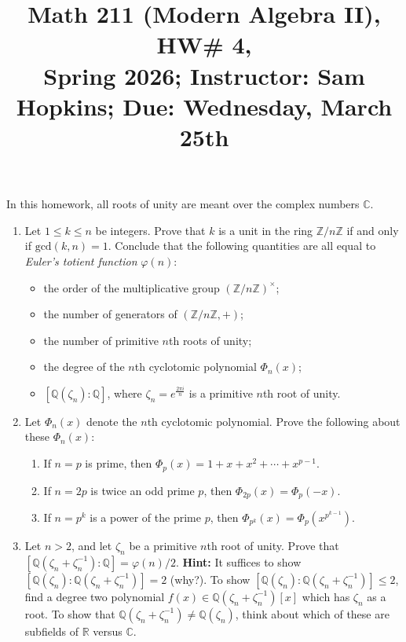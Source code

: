 \documentclass[11pt]{article}
\title{Math 211 (Modern Algebra II), HW\# 4, \\ {\normalsize Spring 2026; Instructor: Sam Hopkins; Due: Wednesday, March 25th}}
\date{}
\begin{document}
\maketitle

\thispagestyle{empty}

In this homework, all roots of unity are meant over the complex numbers $\mathbb{C}$.

\begin{enumerate}

\item Let $1 \leq k \leq n$ be integers. Prove that $k$ is a unit in the ring $\mathbb{Z}/n\mathbb{Z}$ if and only if $\mathrm{gcd}(k,n)=1$. Conclude that the following quantities are all equal to \emph{Euler's totient function} $\varphi(n)$:
\begin{itemize}
\item the order of the multiplicative group $(\mathbb{Z}/n\mathbb{Z})^{\times}$;
\item the number of generators of $(\mathbb{Z}/n\mathbb{Z},+)$;
\item the number of primitive $n$th roots of unity;
\item the degree of the $n$th cyclotomic polynomial $\Phi_n(x)$;
\item $[\mathbb{Q}(\zeta_n)\colon\mathbb{Q}]$, where $\zeta_n=e^{\frac{2\pi i}{n}}$ is a primitive $n$th root of unity.
\end{itemize}

\item Let $\Phi_n(x)$ denote the $n$th cyclotomic polynomial. Prove the following about these $\Phi_n(x)$:
\begin{enumerate}
\item If $n=p$ is prime, then $\Phi_p(x) = 1+x+x^2+\cdots+x^{p-1}$.
\item If $n=2p$ is twice an odd prime $p$, then $\Phi_{2p}(x) = \Phi_p(-x)$.
\item If $n=p^k$ is a power of the prime $p$, then $\Phi_{p^k}(x) = \Phi_{p}(x^{p^{k-1}})$.
\end{enumerate}

\item Let $n > 2$, and let $\zeta_n$ be a primitive $n$th root of unity. Prove that $[\mathbb{Q}(\zeta_n+\zeta_n^{-1}):\mathbb{Q}] = \varphi(n)/2$. {\bf Hint:} It suffices to show $[\mathbb{Q}(\zeta_n):\mathbb{Q}(\zeta_n+\zeta_n^{-1})]=2$ (why?). To show $[\mathbb{Q}(\zeta_n):\mathbb{Q}(\zeta_n+\zeta_n^{-1})] \leq 2$, find a degree two polynomial $f(x) \in \mathbb{Q}(\zeta_n+\zeta_n^{-1})[x]$ which has $\zeta_n$ as a root. To show that $\mathbb{Q}(\zeta_n+\zeta_n^{-1}) \neq \mathbb{Q}(\zeta_n)$, think about which of these are subfields of $\mathbb{R}$ versus $\mathbb{C}$.


\end{enumerate}
\end{document}
